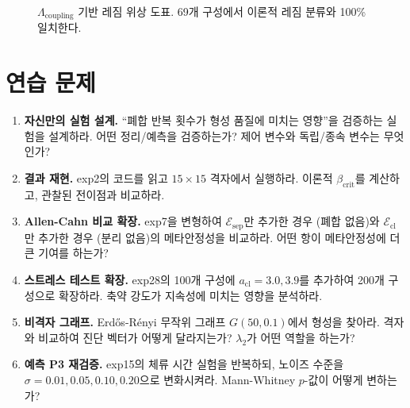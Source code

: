 \begin{figure}[t]
\centering
{}
\caption{$\Lambda_{\mathrm{coupling}}$ 기반 레짐 위상 도표. 69개 구성에서 이론적 레짐 분류와 100\% 일치한다.}
\label{fig:regime-phase-diagram}
\end{figure}


\section{연습 문제}
\label{sec:ch13-exercises}

\begin{enumerate}
    \item \textbf{자신만의 실험 설계.} ``폐합 반복 횟수가 형성 품질에 미치는 영향''을 검증하는 실험을 설계하라. 어떤 정리/예측을 검증하는가? 제어 변수와 독립/종속 변수는 무엇인가?

    \item \textbf{결과 재현.} exp2의 코드를 읽고 $15 \times 15$ 격자에서 실행하라. 이론적 $\beta_{\mathrm{crit}}$를 계산하고, 관찰된 전이점과 비교하라.

    \item \textbf{Allen-Cahn 비교 확장.} exp7을 변형하여 $\mathcal{E}_{\mathrm{sep}}$만 추가한 경우 (폐합 없음)와 $\mathcal{E}_{\mathrm{cl}}$만 추가한 경우 (분리 없음)의 메타안정성을 비교하라. 어떤 항이 메타안정성에 더 큰 기여를 하는가?

    \item \textbf{스트레스 테스트 확장.} exp28의 100개 구성에 $a_{\mathrm{cl}} = 3.0, 3.9$를 추가하여 200개 구성으로 확장하라. 축약 강도가 지속성에 미치는 영향을 분석하라.

    \item \textbf{비격자 그래프.} Erd\H{o}s-R\'{e}nyi 무작위 그래프 $G(50, 0.1)$에서 형성을 찾아라. 격자와 비교하여 진단 벡터가 어떻게 달라지는가? $\lambda_2$가 어떤 역할을 하는가?

    \item \textbf{예측 P3 재검증.} exp15의 체류 시간 실험을 반복하되, 노이즈 수준을 $\sigma = 0.01, 0.05, 0.10, 0.20$으로 변화시켜라. Mann-Whitney $p$-값이 어떻게 변하는가?
\end{enumerate}


